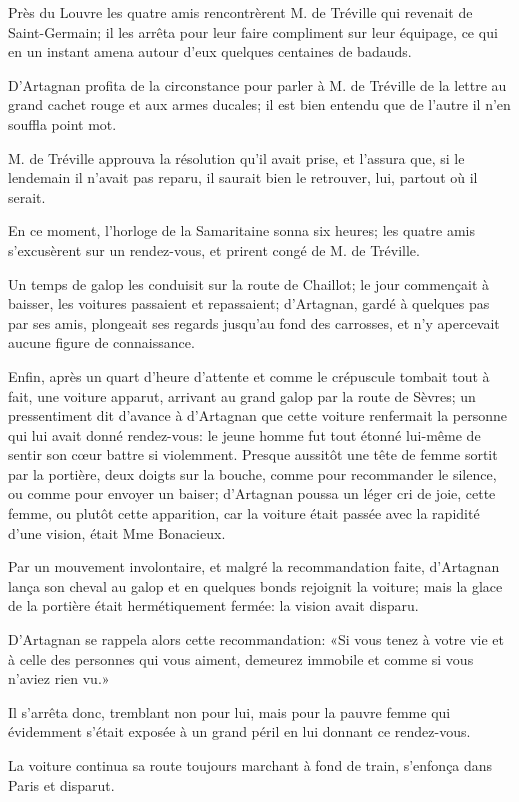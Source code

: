 Près du Louvre les quatre amis rencontrèrent M. de Tréville qui revenait de Saint-Germain; il les arrêta pour leur faire compliment sur leur équipage, ce qui en un instant amena autour d'eux quelques centaines de badauds. 

D'Artagnan profita de la circonstance pour parler à M. de Tréville de la lettre au grand cachet rouge et aux armes ducales; il est bien entendu que de l'autre il n'en souffla point mot. 

M. de Tréville approuva la résolution qu'il avait prise, et l'assura que, si le lendemain il n'avait pas reparu, il saurait bien le retrouver, lui, partout où il serait. 

En ce moment, l'horloge de la Samaritaine sonna six heures; les quatre amis s'excusèrent sur un rendez-vous, et prirent congé de M. de Tréville. 

Un temps de galop les conduisit sur la route de Chaillot; le jour commençait à baisser, les voitures passaient et repassaient; d'Artagnan, gardé à quelques pas par ses amis, plongeait ses regards jusqu'au fond des carrosses, et n'y apercevait aucune figure de connaissance. 

Enfin, après un quart d'heure d'attente et comme le crépuscule tombait tout à fait, une voiture apparut, arrivant au grand galop par la route de Sèvres; un pressentiment dit d'avance à d'Artagnan que cette voiture renfermait la personne qui lui avait donné rendez-vous: le jeune homme fut tout étonné lui-même de sentir son cœur battre si violemment. Presque aussitôt une tête de femme sortit par la portière, deux doigts sur la bouche, comme pour recommander le silence, ou comme pour envoyer un baiser; d'Artagnan poussa un léger cri de joie, cette femme, ou plutôt cette apparition, car la voiture était passée avec la rapidité d'une vision, était Mme Bonacieux. 

Par un mouvement involontaire, et malgré la recommandation faite, d'Artagnan lança son cheval au galop et en quelques bonds rejoignit la voiture; mais la glace de la portière était hermétiquement fermée: la vision avait disparu. 

D'Artagnan se rappela alors cette recommandation: «Si vous tenez à votre vie et à celle des personnes qui vous aiment, demeurez immobile et comme si vous n'aviez rien vu.» 

Il s'arrêta donc, tremblant non pour lui, mais pour la pauvre femme qui évidemment s'était exposée à un grand péril en lui donnant ce rendez-vous. 

La voiture continua sa route toujours marchant à fond de train, s'enfonça dans Paris et disparut. 

